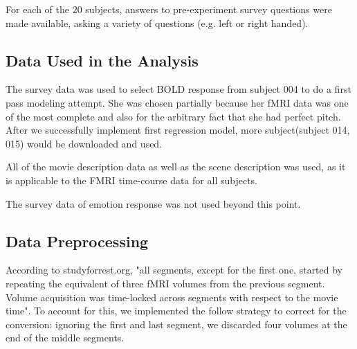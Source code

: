 \par For each of the 20 subjects, answers to pre-experiment survey questions were made available, asking a variety of questions (e.g. left or right handed). 


\subsection{Data Used in the Analysis}
\par The survey data was used to select BOLD response from subject 004 to do a first pass modeling attempt. She was chosen partially because her fMRI data was one of the most complete and also for the arbitrary fact that she had perfect pitch. After we successfully implement first regression model, more subject(subject 014, 015) would be downloaded and used.

\par All of the movie description data as well as the scene description was used, as it is applicable to the FMRI time-course data for all subjects. 

\par The survey data of emotion response was not used beyond this point.

\subsection{Data Preprocessing} 
According to studyforrest.org, "all segments, except for the first one, started by repeating the equivalent of three fMRI volumes from the previous segment. Volume acquisition was time-locked across segments with respect to the movie time". To account for this, we implemented the follow strategy to correct for the conversion: ignoring the first and last segment, we discarded four volumes at the end of the middle segments. 




